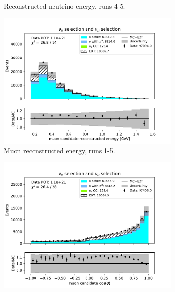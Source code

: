 \begin{figure}[H]
\begin{subfigure}{0.33\linewidth}
        \caption{Reconstructed neutrino energy, runs 4-5.}
    \end{subfigure}    
    \begin{subfigure}{0.33\linewidth}
        \captionsetup{width=0.7\linewidth}
        \includegraphics[width=\linewidth]{technote/Sidebands/Figures/NuMuSideband/muon_sideband_muon_energy_run1234b4c4d5_NUMU_NUMU.pdf}
        \caption{Muon reconstructed energy, runs 1-5.}
    \end{subfigure}%
    \begin{subfigure}{0.33\linewidth}
        \captionsetup{width=0.6\linewidth}
        \includegraphics[width=\linewidth]{technote/Sidebands/Figures/NuMuSideband/muon_sideband_muon_theta_run1234b4c4d5_NUMU_NUMU.pdf}

\end{subfigure}
\end{figure}
